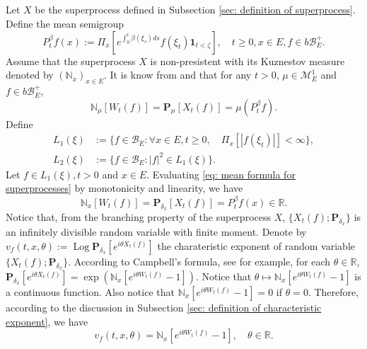 \documentclass[12pt, a4paper]{amsart}
\theoremstyle{definition}
\numberwithin{equation}{section}
\begin{document}
\subsection{}
\label{sec: definition of vf}
	Let $X$ be the superprocess defined in Subsection \ref{sec: definition of superprocess}.
	Define the mean semigroup
\begin{equation}
	P_t^\beta f(x)
	:= \Pi_{x}[e^{\int_0^t \beta(\xi_s)ds}f(\xi_t) \mathbf 1_{t< \zeta}],
	\quad t\geq 0, x\in E, f\in b\mathscr B^+_E.
\end{equation}
    Assume that the superprocess $X$ is non-presistent with its Kuznestov measure denoted by $(\mathbb N_x)_{x\in E}$.
	It is know from \cite[Proposition 2.27]{Li2011Measure-valued} and \cite[Theorem 2.7]{Kyprianou2014Fluctuations} that for any $t > 0$, $\mu \in \mathcal M_E^1$ and $f\in b\mathscr B^+_E$,
\begin{equation}
\label{eq: mean formula for superprocesses}
    \mathbb N_{\mu}[W_t(f)]
    =\mathbf P_{\mu}[X_t(f)]=\mu(P^\beta_t f).
\end{equation}
	Define
\begin{align}
    L_1(\xi)
    &:= \{f\in \mathscr B_E: \forall x\in E, t\geq 0, \quad \Pi_x[|f(\xi_t)|]< \infty\},
	\\L_2(\xi)
    &:= \{f \in \mathscr B_E: |f|^2 \in L_1(\xi)\}.
\end{align}
	Let $f\in L_1(\xi), t >0$ and $x\in E$.
    Evaluating \eqref{eq: mean formula for superprocesses} by monotonicity and linearity, we have
\begin{equation}
    \mathbb N_x[W_t(f)]
    =\mathbf P_{\delta_x}[X_t(f)]=P^\beta_t f(x) \in \mathbb R.
\end{equation}
	Notice that, from the branching property of the superprocess $X$, $\{X_t(f); \mathbf P_{\delta_x}\}$ is an infinitely divisible random variable with finite moment.
	Denote by $v_f(t,x,\theta) := \operatorname{Log} \mathbf P_{\delta_x}[e^{i\theta X_t(f)}]$ the charateristic exponent of random variable $\{X_t(f); \mathbf P_{\delta_x}\}$.
	According to Campbell's formula, see \cite[Theorem 2.7]{Kyprianou2014Fluctuations} for example, for each $\theta \in \mathbb R$,
$	\mathbf P_{\delta_x} [e^{i\theta X_t(f)}]
	= \exp(\mathbb N_x[ e^{i\theta W_t(f)} - 1]).
$
	Notice that $\theta \mapsto \mathbb N_x[e^{i\theta W_t(f)} - 1]$ is a continuous function.
	Also notice that $\mathbb N_x[e^{i\theta W_t(f)} - 1] = 0$ if $\theta = 0$.
	Therefore, according to the discussion in Subsection \ref{sec: definition of characteristic exponent}, we have
\begin{equation}
\label{eq: N and characteristic exponent}
	v_f(t,x,\theta) = \mathbb N_x[e^{i\theta W_t(f)} - 1],
	\quad \theta \in \mathbb R.
\end{equation}
\end{document}
